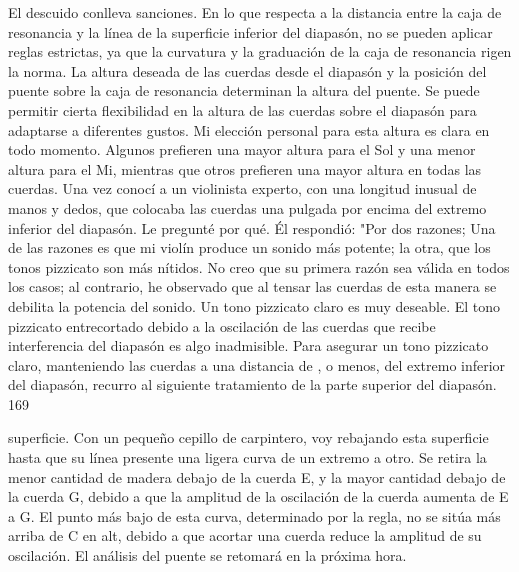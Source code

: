 El descuido conlleva sanciones. En lo que respecta a la distancia entre la caja de resonancia y la línea de la superficie inferior del diapasón, no se pueden aplicar reglas estrictas, ya que la curvatura y la graduación de la caja de resonancia rigen la norma.
La altura deseada de las cuerdas desde el diapasón y la posición del puente sobre la caja de resonancia determinan la altura del puente. Se puede permitir cierta flexibilidad en la altura de las cuerdas sobre el diapasón para adaptarse a diferentes gustos. Mi elección personal para esta altura es clara en todo momento. Algunos prefieren una mayor altura para el Sol y una menor altura para el Mi, mientras que otros prefieren una mayor altura en todas las cuerdas. Una vez conocí a un violinista experto, con una longitud inusual de manos y dedos, que colocaba las cuerdas una pulgada por encima del extremo inferior del diapasón. Le pregunté por qué. Él respondió: "Por dos razones;
Una de las razones es que mi violín produce un sonido más potente; la otra, que los tonos pizzicato son más nítidos. No creo que su primera razón sea válida en todos los casos; al contrario, he observado que al tensar las cuerdas de esta manera se debilita la potencia del sonido.
Un tono pizzicato claro es muy deseable. El tono pizzicato entrecortado debido a la oscilación de las cuerdas que recibe interferencia del diapasón es algo inadmisible. Para asegurar un tono pizzicato claro, manteniendo las cuerdas a una distancia de , o menos, del extremo inferior del diapasón, recurro al siguiente tratamiento de la parte superior del diapasón.
169

superficie. Con un pequeño cepillo de carpintero, voy rebajando esta superficie hasta que su línea presente una ligera curva de un extremo a otro. Se retira la menor cantidad de madera debajo de la cuerda E, y la mayor cantidad debajo de la cuerda G, debido a que la amplitud de la oscilación de la cuerda aumenta de E a G. El punto más bajo de esta curva, determinado por la regla, no se sitúa más arriba de C en alt, debido a que acortar una cuerda reduce la amplitud de su oscilación. El análisis del puente se retomará en la próxima hora.
